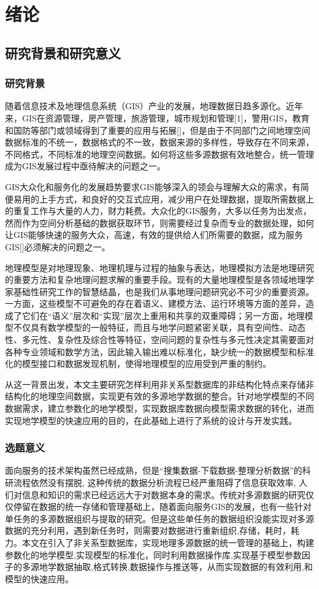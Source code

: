 \documentclass[master]{njnuthesis}
\begin{document}
\chapter{绪论}
\section{研究背景和研究意义}
\subsection{研究背景}
随着信息技术及地理信息系统（GIS）产业的发展，地理数据日趋多源化。近年来，GIS在资源管理，房产管理，旅游管理，城市规划和管理[1]，警用GIS，教育和国防等部门或领域得到了重要的应用与拓展[]，但是由于不同部门之间地理空间数据标准的不统一，数据格式的不一致，数据来源的多样性，导致存在不同来源，不同格式，不同标准的地理空间数据。如何将这些多源数据有效地整合，统一管理成为GIS发展过程中亟待解决的问题之一。

GIS大众化和服务化的发展趋势要求GIS能够深入的领会与理解大众的需求，有简便易用的上手方式，和良好的交互式应用，减少用户在处理数据，提取所需数据上的重复工作与大量的人力，财力耗费。大众化的GIS服务，大多以任务为出发点，然而作为空间分析基础的数据获取环节，则需要经过复杂而专业的数据处理，如何让GIS能够快速的服务大众，高速，有效的提供给人们所需要的数据，成为服务GIS[]必须解决的问题之一。

地理模型是对地理现象、地理机理与过程的抽象与表达，地理模拟方法是地理研究的重要方法和复杂地理问题求解的重要手段。现有的大量地理模型是各领域地理学家基础性研究工作的智慧结晶，也是我们从事地理问题研究必不可少的重要资源。一方面，这些模型不可避免的存在着语义、建模方法、运行环境等方面的差异，造成了它们在“语义”层次和“实现”层次上重用和共享的双重障碍；另一方面，地理模型不仅具有数学模型的一般特征，而且与地学问题紧密关联，具有空间性、动态性、多元性、复杂性及综合性等特征，空间问题的复杂性与多元性决定其需要面对各种专业领域和数学方法，因此输入输出难以标准化，缺少统一的数据模型和标准化的模型接口和数据发现机制，使得地理模型的应用受到严重的制约。

从这一背景出发，本文主要研究怎样利用非关系型数据库的非结构化特点来存储非结构化的地理空间数据，实现更有效的多源地学数据的整合。针对地学模型的不同数据需求，建立参数化的地学模型，实现数据库数据向模型需求数据的转化，进而实现地学模型的快速应用的目的，在此基础上进行了系统的设计与开发实践。

\subsection{选题意义}
面向服务的技术架构虽然已经成熟，但是“搜集数据-下载数据-整理分析数据”的科研流程依然没有摆脱, 这种传统的数据分析流程已经严重阻碍了信息获取效率, 人们对信息和知识的需求已经远远大于对数据本身的需求。传统对多源数据的研究仅仅停留在数据的统一存储和管理基础上，随着面向服务GIS的发展，也有一些针对单任务的多源数据组织与提取的研究。但是这些单任务的数据组织没能实现对多源数据的充分利用，遇到新任务时，则需要对数据进行重新组织,存储，耗时，耗力。本文在引入了非关系型数据库，实现地理多源数据的统一管理的基础上，构建参数化的地学模型,实现模型的标准化，同时利用数据操作库,实现基于模型参数因子的多源地学数据抽取,格式转换,数据操作与推送等，从而实现数据的有效利用,和模型的快速应用。
\end{document}
